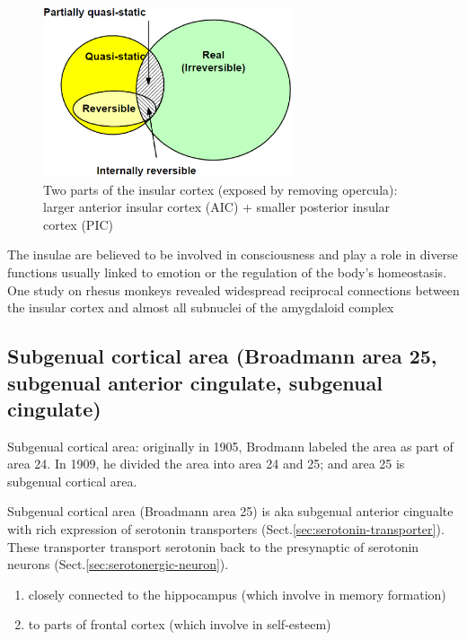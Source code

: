 \begin{figure}[hbt]
  \centerline{\includegraphics[height=5cm,
    angle=0]{./images/internal_reversible.eps}}
\caption{Two parts of the insular cortex (exposed by removing opercula): larger
anterior insular cortex (AIC) + smaller posterior insular cortex (PIC)}
\label{fig:insular-cortex}
\end{figure}

The insulae are believed to be involved in consciousness and play a role in
diverse functions usually linked to emotion or the regulation of the body's
homeostasis. One study on rhesus monkeys revealed widespread reciprocal
connections between the insular cortex and almost all subnuclei of the
amygdaloid complex




\subsection{Subgenual cortical area (Broadmann area 25, subgenual anterior
cingulate, subgenual cingulate)}
\label{sec:subgenual-cortical-area}	
\label{sec:broadmann-area-25}

Subgenual cortical area: originally in 1905, Brodmann labeled the area as part
of area 24. In 1909, he divided the area into area 24 and 25; and area 25 is
subgenual cortical area.

Subgenual cortical area (Broadmann area 25) is aka subgenual anterior cingualte
with rich expression of serotonin transporters (Sect.\ref{sec:serotonin-transporter}).
These transporter transport serotonin back to the presynaptic of serotonin
neurons (Sect.\ref{sec:serotonergic-neuron}).

\begin{enumerate}
  \item closely connected to the hippocampus (which involve in memory
  formation)
  \item to parts of frontal cortex (which involve in self-esteem)
\end{enumerate}


